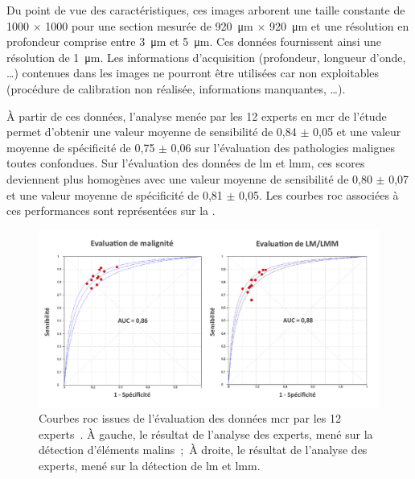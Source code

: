 Du point de vue des caractéristiques, ces images arborent une taille constante de \SI{1000}{\px} $\times$ \SI{1000}{\px} pour une section mesurée de \SI{920}{\micro\metre} $\times$ \SI{920}{\micro\metre} et une résolution en profondeur comprise entre \SI{3}{\micro\metre} et \SI{5}{\micro\metre}. Ces données fournissent ainsi une résolution de \SI{1}{\micro\metre}. Les informations d'acquisition (profondeur, longueur d'onde, \ldots) contenues dans les images ne pourront être utilisées car non exploitables (procédure de calibration non réalisée, informations manquantes, \ldots).\par
\clearpage

À partir de ces données, l'analyse menée par les 12 experts en \gls{mcr} de l'étude~\cite{Cinotti2018} permet d'obtenir une valeur moyenne de sensibilité de 0,84 $\pm$ 0,05 et une valeur moyenne de spécificité de 0,75 $\pm$ 0,06 sur l'évaluation des pathologies malignes toutes confondues. Sur l'évaluation des données de \gls{lm} et \gls{lmm}, ces scores deviennent plus homogènes avec une valeur moyenne de sensibilité de 0,80 $\pm$ 0,07 et une valeur moyenne de spécificité de 0,81 $\pm$ 0,05. Les courbes \gls{roc} associées à ces performances sont représentées sur la .\par

\begin{figure}[H]
    \begin{center}
        \includegraphics[width=0.95\linewidth]{contents/ii_preamble_microscopy/resources/results_roc_rcm_experts.pdf}
        \caption{Courbes \gls{roc} issues de l'évaluation des données \gls{mcr} par les 12 experts~\cite{Cinotti2018}. À gauche, le résultat de l'analyse des experts, mené sur la détection d'éléments malins~;~À droite, le résultat de l'analyse des experts, mené sur la détection de \gls{lm} et \gls{lmm}.}
        \label{fig:results_roc_rcm_experts}
    \end{center} 
\end{figure}\par

